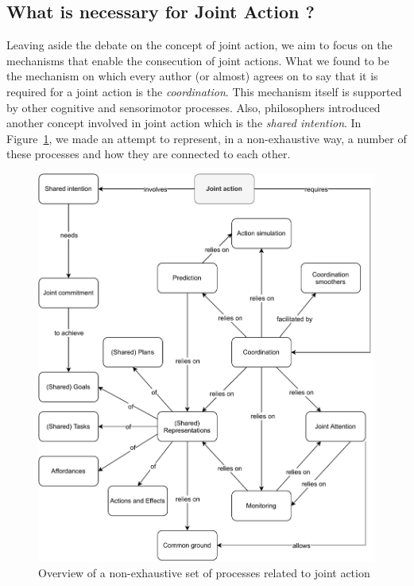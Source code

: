 \documentclass[a4paper,11pt,twoside]{StyleThese}
\begin{document}
\subsection{What is necessary for Joint Action ?}\label{chap1:subsec:necess_ja}

Leaving aside the debate on the concept of joint action, we aim to focus on the mechanisms that enable the consecution of joint actions. What we found to be the mechanism on which every author (or almost) agrees on to say that it is required for a joint action is the \textit{coordination}. This mechanism itself is supported by other cognitive and sensorimotor processes. Also, philosophers introduced another concept involved in joint action which is the \textit{shared intention}. In Figure~\ref{chap1:fig:ja}, we made an attempt to represent, in a non-exhaustive way, a number of these processes and how they are connected to each other.

 \begin{figure}[!ht]
	\includegraphics[width=\linewidth]{figures/chapter1/joint_action.pdf}
	\caption{Overview of a non-exhaustive set of processes related to joint action}
	\label{chap1:fig:ja}
\end{figure}
\end{document}
